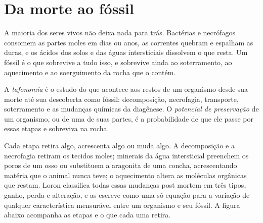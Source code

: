 \section{Da morte ao fóssil}\label{sec:b2:palaeoenvironments:taphonomy}

A maioria dos seres vivos não deixa nada para trás. Bactérias e necrófagos consomem as partes moles em
dias ou anos, as correntes quebram e espalham as duras, e os ácidos dos solos e das águas intersticiais
dissolvem o que resta. Um fóssil é o que sobrevive a tudo isso, e sobrevive ainda ao soterramento,
ao aquecimento e ao soerguimento da rocha que o contém.

\begin{definition}\label{def:b2:palaeoenvironments:taphonomy}
A \emph{tafonomia} é o estudo do que acontece aos restos de um organismo
desde sua morte até sua descoberta como fóssil: decomposição, necrofagia, transporte, soterramento e as
mudanças químicas da diagênese. O \emph{potencial de preservação}
de um organismo, ou de uma de suas partes, é a probabilidade de que ele passe por essas etapas
e sobreviva na rocha.
\end{definition}

Cada etapa retira algo, acrescenta algo ou muda algo. A decomposição e a necrofagia retiram os
tecidos moles; minerais da água intersticial preenchem os poros de um osso ou substituem a aragonita de uma
concha, acrescentando matéria que o animal nunca teve; o aquecimento altera as moléculas orgânicas que restam.
Loron classifica todas essas mudanças post mortem em três tipos, ganho, perda e alteração, e
as escreve como uma só equação para a variação de qualquer característica mensurável entre um organismo e seu
fóssil. A figura abaixo acompanha as etapas e o que cada uma retira.

